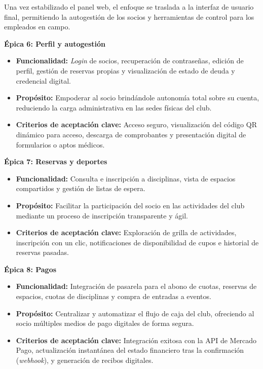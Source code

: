Una vez estabilizado el panel web, el enfoque se traslada a la interfaz de usuario final, permitiendo la autogestión de los socios y herramientas de control para los empleados en campo.

\textbf{Épica 6: Perfil y autogestión}
\begin{itemize}
    \item \textbf{Funcionalidad:} \textit{Login} de socios, recuperación de contraseñas, edición de perfil, gestión de reservas propias y visualización de estado de deuda y credencial digital.
    \item \textbf{Propósito:} Empoderar al socio brindándole autonomía total sobre su cuenta, reduciendo la carga administrativa en las sedes físicas del club.
    \item \textbf{Criterios de aceptación clave:} Acceso seguro, visualización del código QR dinámico para acceso, descarga de comprobantes y presentación digital de formularios o aptos médicos.
\end{itemize}

\textbf{Épica 7: Reservas y deportes}
\begin{itemize}
    \item \textbf{Funcionalidad:} Consulta e inscripción a disciplinas, vista de espacios compartidos y gestión de listas de espera.
    \item \textbf{Propósito:} Facilitar la participación del socio en las actividades del club mediante un proceso de inscripción transparente y ágil.
    \item \textbf{Criterios de aceptación clave:} Exploración de grilla de actividades, inscripción con un clic, notificaciones de disponibilidad de cupos e historial de reservas pasadas.
\end{itemize}

\textbf{Épica 8: Pagos}
\begin{itemize}
    \item \textbf{Funcionalidad:} Integración de pasarela para el abono de cuotas, reservas de espacios, cuotas de disciplinas y compra de entradas a eventos.
    \item \textbf{Propósito:} Centralizar y automatizar el flujo de caja del club, ofreciendo al socio múltiples medios de pago digitales de forma segura.
    \item \textbf{Criterios de aceptación clave:} Integración exitosa con la API de Mercado Pago, actualización instantánea del estado financiero tras la confirmación (\textit{webhook}), y generación de recibos digitales.
\end{itemize}

